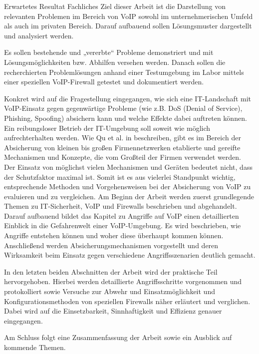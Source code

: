 \documentclass[a4paper,11pt,ngerman]{INSOexpose}
\begin{document}
\begin{section}{Erwartetes Resultat}
Fachliches Ziel dieser Arbeit ist die Darstellung von relevanten Problemen im Bereich von VoIP sowohl im unternehmerischen Umfeld als auch im privaten Bereich. Darauf aufbauend sollen Lösungsmuster dargestellt und analysiert werden. 

Es sollen bestehende und „vererbte“ Probleme demonstriert und mit Lösungsmöglichkeiten bzw. Abhilfen versehen werden. 
Danach sollen die recherchierten Problemlösungen anhand einer Testumgebung im Labor mittels einer speziellen VoIP-Firewall getestet und dokumentiert werden.

Konkret wird auf die Fragestellung eingegangen, wie sich eine IT-Landschaft mit VoIP-Einsatz gegen gegenwärtige Probleme (wie z.B. DoS (Denial of Service), Phishing, Spoofing) absichern kann und welche Effekte dabei auftreten können. Ein reibungsloser Betrieb der IT-Umgebung soll soweit wie möglich aufrechterhalten werden.
Wie Qu et al. in \cite{Qu:2009:desactv}  beschreiben, gibt es im Bereich der Absicherung von kleinen bis großen Firmennetzwerken  etablierte und gereifte Mechanismen und Konzepte, die vom Großteil der Firmen verwendet werden. 
\\
Der Einsatz von möglichst vielen Mechanismen und Geräten bedeutet nicht, dass der Schutzfaktor maximal ist. Somit ist es aus vielerlei Standpunkt wichtig, entsprechende Methoden und Vorgehensweisen bei der Absicherung von VoIP zu evaluieren und zu vergleichen.
Am Beginn der Arbeit werden zuerst grundlegende Themen zu IT-Sicherheit, VoIP und Firewalls beschrieben und abgehandelt. Darauf aufbauend bildet das Kapitel zu Angriffe auf VoIP einen detaillierten Einblick in die Gefahrenwelt einer VoIP-Umgebung. Es wird beschrieben, wie Angriffe entstehen können und woher diese überhaupt kommen können. Anschließend werden  Absicherungsmechanismen vorgestellt und deren Wirksamkeit beim Einsatz gegen verschiedene Angriffsszenarien deutlich gemacht.

In den letzten beiden Abschnitten der Arbeit wird der praktische Teil hervorgehoben. Hierbei werden detaillierte Angriffsschritte vorgenommen und protokolliert sowie Versuche zur Abwehr und Einsatzmöglichkeit und Konfigurationsmethoden von speziellen Firewalls näher erläutert und verglichen. Dabei wird auf die Einsetzbarkeit, Sinnhaftigkeit und Effizienz genauer eingegangen.

Am Schluss folgt eine Zusammenfassung der Arbeit sowie ein Ausblick auf kommende Themen.
\end{section}
\pagebreak
\end{document}

